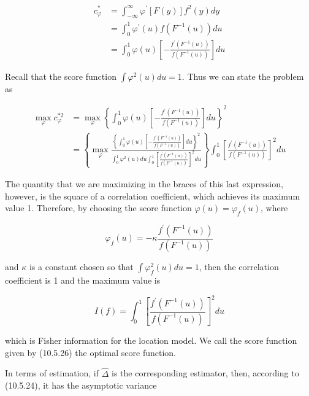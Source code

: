 \begin{align*}
c_{\varphi}^{*} & =\int_{-\infty}^{\infty} \varphi^{\prime}[F(y)] f^{2}(y) d y \\
& =\int_{0}^{1} \varphi^{\prime}(u) f\left(F^{-1}(u)\right) d u \\
& =\int_{0}^{1} \varphi(u)\left[-\frac{f^{\prime}\left(F^{-1}(u)\right)}{f\left(F^{-1}(u)\right)}\right] d u \tag{10.5.25}
\end{align*}


Recall that the score function $\int \varphi^{2}(u) d u=1$. Thus we can state the problem as

$$
\begin{aligned}
\max _{\varphi} c_{\varphi}^{* 2} & =\max _{\varphi}\left\{\int_{0}^{1} \varphi(u)\left[-\frac{f^{\prime}\left(F^{-1}(u)\right)}{f\left(F^{-1}(u)\right)}\right] d u\right\}^{2} \\
& =\left\{\max _{\varphi} \frac{\left\{\int_{0}^{1} \varphi(u)\left[-\frac{f^{\prime}\left(F^{-1}(u)\right)}{f\left(F^{-1}(u)\right)}\right] d u\right\}^{2}}{\int_{0}^{1} \varphi^{2}(u) d u \int_{0}^{1}\left[\frac{f^{\prime}\left(F^{-1}(u)\right)}{f\left(F^{-1}(u)\right)}\right]^{2} d u}\right\} \int_{0}^{1}\left[\frac{f^{\prime}\left(F^{-1}(u)\right)}{f\left(F^{-1}(u)\right)}\right]^{2} d u
\end{aligned}
$$

The quantity that we are maximizing in the braces of this last expression, however, is the square of a correlation coefficient, which achieves its maximum value 1. Therefore, by choosing the score function $\varphi(u)=\varphi_{f}(u)$, where


\begin{equation*}
\varphi_{f}(u)=-\kappa \frac{f^{\prime}\left(F^{-1}(u)\right)}{f\left(F^{-1}(u)\right)} \tag{10.5.26}
\end{equation*}


and $\kappa$ is a constant chosen so that $\int \varphi_{f}^{2}(u) d u=1$, then the correlation coefficient is 1 and the maximum value is


\begin{equation*}
I(f)=\int_{0}^{1}\left[\frac{f^{\prime}\left(F^{-1}(u)\right)}{f\left(F^{-1}(u)\right)}\right]^{2} d u \tag{10.5.27}
\end{equation*}


which is Fisher information for the location model. We call the score function given by (10.5.26) the optimal score function.

In terms of estimation, if $\widehat{\Delta}$ is the corresponding estimator, then, according to (10.5.24), it has the asymptotic variance


